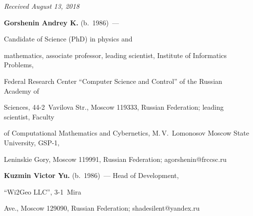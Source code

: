 







\vspace*{-3pt}





\hfill{\small\textit{Received August 13, 2018}}    


  








\Contr





\noindent


\textbf{Gorshenin Andrey K.} (b.\ 1986)~--- 


Candidate of Science (PhD) in physics and


mathematics, associate professor, leading scientist, Institute of Informatics Problems,


Federal Research Center ``Computer Science and Control'' of the Russian Academy of


Sciences, 44-2~Vavilova Str., Moscow 119333, Russian Federation;  leading scientist, Faculty 


of Computational Mathematics and Cybernetics, M.\,V.~Lomonosov Moscow State University, GSP-1, 


Leninskie Gory, Moscow 119991, Russian Federation; \mbox{agorshenin@frccsc.ru}





\vspace*{5pt}





\noindent


\textbf{Kuzmin Victor Yu.} (b.\ 1986)~--- Head of Development, 


``Wi2Geo LLC'', 3-1~Mira 


Ave., Moscow 129090, Russian Federation; \mbox{shadesilent@yandex.ru}


\label{end\stat}








\renewcommand{\bibname}{\protect\rm Литература}


